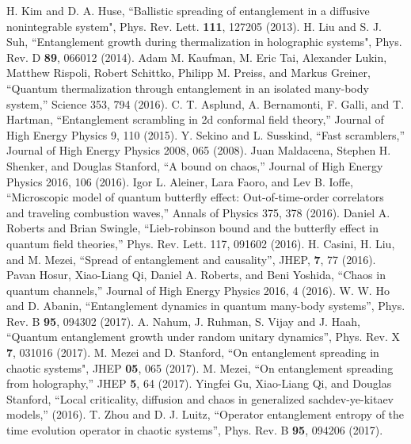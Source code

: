 \documentclass[aps,prx,twocolumn,superscriptaddress,floatfix,nofootinbib,prx]{revtex4}
\renewcommand{\>}{\right\rangle}
\newcommand{\<}{\left\langle}
\begin{document}
%

\begin{thebibliography}{2}

H. Kim and D. A. Huse, ``Ballistic spreading of entanglement in a diffusive nonintegrable system",  Phys. Rev. Lett. {\bf 111}, 127205 (2013).
H. Liu and S. J. Suh, ``Entanglement growth during thermalization in holographic systems", Phys. Rev. D {\bf 89}, 066012 (2014).
 Adam M. Kaufman, M. Eric Tai, Alexander Lukin, Matthew Rispoli, Robert Schittko, Philipp M. Preiss, and Markus Greiner, ``Quantum thermalization through entanglement in an isolated many-body system,'' Science 353, 794  (2016).
 C. T. Asplund, A. Bernamonti, F. Galli, and T. Hartman, ``Entanglement scrambling in 2d conformal field theory,'' Journal of High Energy Physics 9, 110 (2015).
 Y. Sekino and L. Susskind, ``Fast scramblers,'' Journal of High Energy Physics 2008, 065 (2008).
 Juan Maldacena, Stephen H. Shenker, and Douglas Stanford, ``A bound on chaos,'' Journal of High Energy Physics 2016, 106 (2016). 
 Igor L. Aleiner, Lara Faoro, and Lev B. Ioffe, ``Microscopic model of quantum butterfly effect: Out-of-time-order correlators and traveling combustion waves,'' Annals of Physics 375, 378 (2016). 
 Daniel A. Roberts and Brian Swingle, ``Lieb-robinson bound and the butterfly effect in quantum field theories,'' Phys. Rev. Lett. 117, 091602 (2016). 
H. Casini, H. Liu, and M. Mezei, ``Spread of entanglement and causality'', JHEP, {\bf 7}, 77 (2016).
 Pavan Hosur, Xiao-Liang Qi, Daniel A. Roberts, and  Beni Yoshida, ``Chaos in quantum channels,'' Journal of High Energy Physics 2016, 4 (2016).
W. W. Ho and D. Abanin, ``Entanglement dynamics in quantum many-body systems'', Phys. Rev. B {\bf 95}, 094302 (2017).
A. Nahum, J. Ruhman, S. Vijay and J. Haah, ``Quantum entanglement growth under random unitary dynamics'', Phys. Rev. X {\bf 7}, 031016 (2017).
M. Mezei and D. Stanford, ``On entanglement spreading in chaotic systems", JHEP {\bf 05}, 065 (2017).
M. Mezei, ``On entanglement spreading from holography,'' JHEP  {\bf 5}, 64 (2017).
 Yingfei Gu, Xiao-Liang Qi, and Douglas Stanford, ``Local criticality, diffusion and chaos in generalized sachdev-ye-kitaev models,'' (2016).
T. Zhou and D. J. Luitz, ``Operator entanglement entropy of the time evolution operator in chaotic systems'', Phys. Rev. B {\bf 95}, 094206 (2017).

\end{thebibliography}
\end{document}

